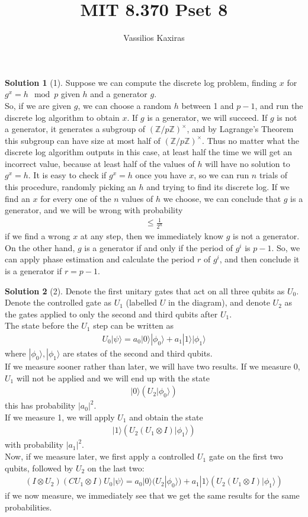 \documentclass[11pt]{article}
\author{Vassilios Kaxiras}
\title{MIT 8.370 Pset 8}
\theoremstyle{definition}
\newtheorem*{solution}{Solution}
\newcommand{\eq}{\begin{equation}\begin{aligned}}
\newcommand{\qe}{\end{aligned}\end{equation}}
\newcommand{\ket}[1]{|#1\rangle}
\begin{document}
\maketitle

\begin{solution}[1]
  Suppose we can compute the discrete log problem, finding $x$ for $g^x=h\mod p$ given $h$ and a generator $g$. \\
  So, if we are given $g$, we can choose a random $h$ between 1 and $p-1$, and run the discrete log algorithm to obtain 
  $x$. If $g$ is a generator, we will succeed. If $g$ is not a generator, it generates a subgroup of $(\mathbb{Z}/p\mathbb{Z})^{\times}$,
  and by Lagrange's Theorem this subgroup can have size at most half of $(\mathbb{Z}/p\mathbb{Z})^{\times}$. Thus no matter what
  the discrete log algorithm outputs in this case, at least half the time we will get an incorrect value, because at least half of the
  values of $h$ will have no solution to $g^x=h$. It is easy to check
  if $g^x=h$ once you have $x$, so we can run $n$ trials of this procedure, randomly picking an $h$ and trying to find its
  discrete log. If we find an $x$ for every one of the $n$ values of $h$ we choose, we can conclude that $g$ is a generator, and we will be wrong with probability
  \eq
    \leq \frac{1}{2^n}
  \qe
  if we find a wrong $x$ at any step, then we immediately know $g$ is not a generator.\\
  On the other hand, $g$ is a generator if and only if the period of $g^i$ is $p-1$. So, we can apply phase estimation and calculate the period $r$ of $g^i$, and then 
  conclude it is a generator if $r=p-1$.
\end{solution}

\begin{solution}[2]
  Denote the first unitary gates that act on all three qubits as $U_0$. Denote the controlled gate as $U_1$ (labelled $U$ in the diagram), and denote $U_2$ as the gates applied to only the second and third qubits after $U_1$.\\
  The state before the $U_1$ step can be written as 
  \eq
    U_0\ket{\psi}=a_0\ket{0}\ket{\phi_0}+a_1\ket{1}\ket{\phi_1}
  \qe
  where $\ket{\phi_0},\ket{\phi_1}$ are states of the second and third qubits.\\
  If we measure sooner rather than later, we will have two results. If we measure 0, $U_1$ will not be applied and we will end up with the state
  \eq
    \ket{0}(U_2\ket{\phi_0})
  \qe
  this has probability $|a_0|^2$. \\
  If we measure 1, we will apply $U_1$ and obtain the state
  \eq
    \ket{1}(U_2(U_1\otimes I)\ket{\phi_1})
  \qe
  with probability $|a_1|^2$.\\
  Now, if we measure later, we first apply a controlled $U_1$ gate on the first two qubits, followed by $U_2$ on the last two:
  \eq
    (I\otimes U_2)(CU_1\otimes I)U_0\ket{\psi}=a_0\ket{0}(U_2\ket{\phi_0})+a_1\ket{1}(U_2(U_1\otimes I)\ket{\phi_1})
  \qe
  if we now measure, we immediately see that we get the same results for the same probabilities.
\end{solution}
\end{document}
